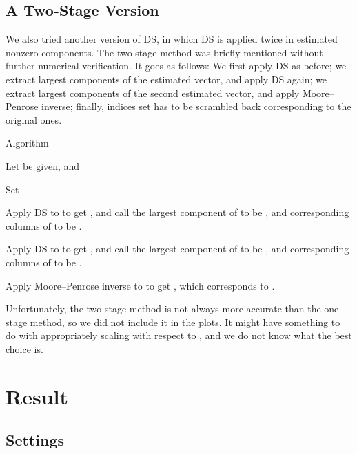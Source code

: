 \subsection {A Two-Stage Version}

We also tried another version of DS, in which DS is applied twice in estimated nonzero components.
The two-stage method was briefly mentioned \cite {CaT07} without further numerical verification.
It goes as follows:
We first apply DS as before;
we extract largest components of the estimated vector, and apply DS again;
we extract largest components of the second estimated vector, and apply Moore–Penrose inverse;
finally, indices set has to be scrambled back corresponding to the original ones.

\Result
{Algorithm}
{
\startitemize[n]
\item Let  be given, and 

\item Set

\item Apply DS to  to get , and call the  largest component of  to be , and corresponding columns of  to be .

\item Apply DS to  to get , and call the  largest component of  to be , and corresponding columns of  to be .

\item Apply Moore–Penrose inverse to  to get , which corresponds to .
\stopitemize
}

Unfortunately, the two-stage method is not always more accurate than the one-stage method, so we did not include it in the plots.
It might have something to do with appropriately scaling  with respect to , and we do not know what the best choice is.



\section {Result}

\subsection {Settings}

